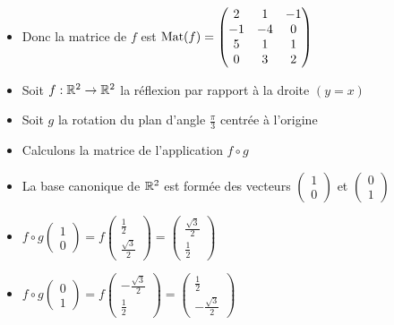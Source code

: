 \begin{frame}
\begin{exemple}
\begin{itemize}[<+->]
  \item Donc la matrice de $f$ est 
$\mathop{\text{Mat}}\nolimits(f) = 
\begin{pmatrix}
2 & 1 & -1 \\
-1& -4& 0  \\
 5& 1 & 1 \\
 0 & 3 & 2 \\              
\end{pmatrix}$
\end{itemize}

  

\end{exemple}
\end{frame}


\begin{frame}
\begin{exemple}
\begin{itemize}[<+->]\setlength{\itemsep}{4pt}
  \item Soit $f : \mathbb{R}^2 \to \mathbb{R}^2$ la réflexion par rapport à la droite $(y=x)$
  
  \item Soit $g$ la rotation du plan d'angle $\frac\pi3$ centrée à l'origine
  
  \item Calculons la matrice de l'application $f\circ g$
  
  \item La base canonique de $\mathbb{R}^2$ est formée des vecteurs
$\left(\begin{smallmatrix} 1 \\ 0 \end{smallmatrix} \right)$ 
et $\left(\begin{smallmatrix} 0 \\ 1 \end{smallmatrix} \right)$
  
  \item $f\circ g \begin{pmatrix} 1 \\ 0 \end{pmatrix}
= f \begin{pmatrix} \frac12 \\ \frac{\sqrt{3}}{2} \end{pmatrix}
= \begin{pmatrix} \frac{\sqrt{3}}{2} \\ \frac12 \end{pmatrix}$

  \item $f\circ g \begin{pmatrix} 0 \\ 1 \end{pmatrix}
= f \begin{pmatrix}  -\frac{\sqrt{3}}{2} \\ \frac12  \end{pmatrix}
= \begin{pmatrix} \frac12 \\ -\frac{\sqrt{3}}{2}  \end{pmatrix}$


\end{itemize}
\end{exemple}
\end{frame}
